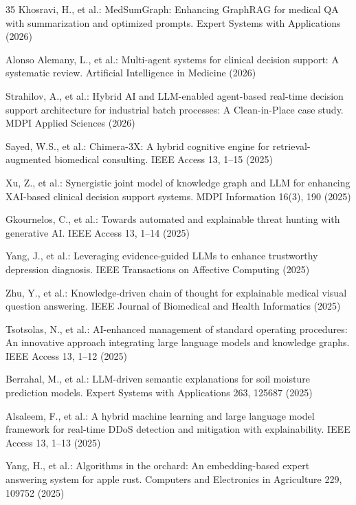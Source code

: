 \documentclass[lnbip]{svmultln}
\begin{document}
\begin{thebibliography}{35}
 Khosravi, H., et al.: MedSumGraph: Enhancing GraphRAG for medical QA with summarization and optimized prompts. Expert Systems with Applications (2026)

 Alonso Alemany, L., et al.: Multi-agent systems for clinical decision support: A systematic review. Artificial Intelligence in Medicine (2026)

 Strahilov, A., et al.: Hybrid AI and LLM-enabled agent-based real-time decision support architecture for industrial batch processes: A Clean-in-Place case study. MDPI Applied Sciences (2026)

 Sayed, W.S., et al.: Chimera-3X: A hybrid cognitive engine for retrieval-augmented biomedical consulting. IEEE Access 13, 1--15 (2025)

 Xu, Z., et al.: Synergistic joint model of knowledge graph and LLM for enhancing XAI-based clinical decision support systems. MDPI Information 16(3), 190 (2025)

 Gkournelos, C., et al.: Towards automated and explainable threat hunting with generative AI. IEEE Access 13, 1--14 (2025)

 Yang, J., et al.: Leveraging evidence-guided LLMs to enhance trustworthy depression diagnosis. IEEE Transactions on Affective Computing (2025)

 Zhu, Y., et al.: Knowledge-driven chain of thought for explainable medical visual question answering. IEEE Journal of Biomedical and Health Informatics (2025)

 Tsotsolas, N., et al.: AI-enhanced management of standard operating procedures: An innovative approach integrating large language models and knowledge graphs. IEEE Access 13, 1--12 (2025)

 Berrahal, M., et al.: LLM-driven semantic explanations for soil moisture prediction models. Expert Systems with Applications 263, 125687 (2025)

 Alsaleem, F., et al.: A hybrid machine learning and large language model framework for real-time DDoS detection and mitigation with explainability. IEEE Access 13, 1--13 (2025)

 Yang, H., et al.: Algorithms in the orchard: An embedding-based expert answering system for apple rust. Computers and Electronics in Agriculture 229, 109752 (2025)


\end{thebibliography}
\end{document}
